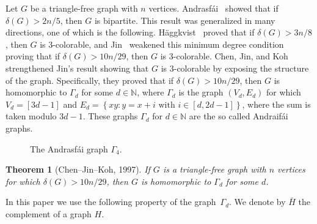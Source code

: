 \documentclass[a4paper,12pt]{article}
\newtheorem{theorem}{Theorem}
\newtheorem{proposition}[theorem]{Proposition}
\newcommand{\andrasfai}{Andrasf\'ai}
\begin{document}
Let \(G\) be a triangle-free graph with \(n\) vertices.
\andrasfai~\cite{andrasfal1964graphentheoretische} showed that 
if \(\delta(G) > 2n/5\), then \(G\) is bipartite.
This result was generalized in many directions,
one of which is the following.
%
H{\"a}ggkvist~\cite{haggkvist1982odd} proved that if \(\delta(G) > 3n/8\), 
then \(G\) is \(3\)-colorable,
%
and Jin~\cite{jin1995triangle} weakened this minimum degree condition 
proving that if \(\delta(G) > 10n/29\), 
then \(G\) is \(3\)-colorable.
%
Chen, Jin, and Koh~\cite{chen1997triangle} strengthened Jin's result
showing that \(G\) is \(3\)-colorable by exposing the structure of the graph.
Specifically, they proved that if \(\delta(G) > 10n/29\),
then \(G\) is homomorphic to \(\Gamma_d\) for some \(d\in\mathbb{N}\),
where \(\Gamma_d\) is the graph \((V_d,E_d)\)
for which \(V_d = [3d-1]\) and \(E_d = \left\{xy : y = x + i \text{ with } i \in [d,2d-1]\right\}\),
where the sum is taken modulo \(3d-1\).
These graphs \(\Gamma_d\) for \(d \in \mathbb{N}\) are the so called Andraifái graphs. 

\begin{figure}[ht]
    \centering
        \centering
    \caption{The Andrasfái graph $\Gamma_4$.}
    \label{fig:andrasfai_graph}
\end{figure}

\begin{theorem}[Chen--Jin--Koh, 1997]\label{thm:ChenJinKoh}
	If \(G\) is a triangle-free graph with \(n\) vertices
	for which \(\delta(G) > 10n/29\),
	then \(G\) is homomorphic to \(\Gamma_d\) for some \(d\).
\end{theorem}

In this paper we use the following property of the graph~\(\Gamma_d\).
We denote by \(\bar{H}\) the complement of a graph \(H\). 

\end{document}
